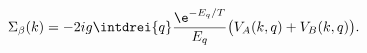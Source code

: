 \begin{equation*}
  \Sigma_\beta(k)=-2ig\intdrei{q}
  \frac{\e^{-E_q/T}}{E_q}\bigl(V_{A}(k,q)+V_{B}(k,q)\bigr).
\end{equation*}

